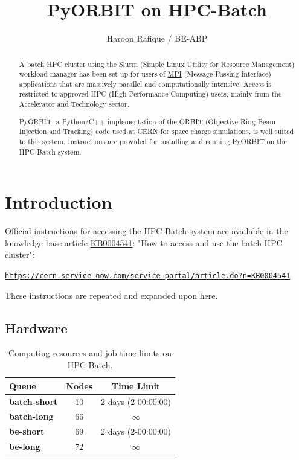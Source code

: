 \documentclass[a4paper]{cernatsnote}
\title{PyORBIT on HPC-Batch}
\author{Haroon Rafique / BE-ABP}
\def \howtoaccess {\url{https://cern.service-now.com/service-portal/article.do?n=KB0004541}}
\begin{document}
	
\maketitle %

\begin{abstract}
	A batch HPC cluster using the \href{https://slurm.schedmd.com/}{Slurm} (Simple Linux Utility for Resource Management) workload manager has been set up for users of \href{https://www.open-mpi.org/}{MPI} (Message Passing Interface) applications that are massively parallel and computationally intensive. Access is restricted to approved HPC (High Performance Computing) users, mainly from the Accelerator and Technology sector. 
	
	PyORBIT, a Python/C++ implementation of the ORBIT (Objective Ring Beam Injection and Tracking) code used at CERN for space charge simulations, is well suited to this system. Instructions are provided for installing and running PyORBIT on the HPC-Batch system.
\end{abstract}

\section{Introduction}
\label{sec:intro}
	
Official instructions for accessing the HPC-Batch system are available in the knowledge base article \href{https://cern.service-now.com/service-portal/article.do?n=KB0004541}{KB0004541}: "How to access and use the batch HPC cluster":

\texttt{\howtoaccess}

These instructions are repeated and expanded upon here. 
	
\subsection{Hardware}

\begin{table}
	\begin{center}
		\begin{tabular}[!b]{|l|c|c|}
			\hline
			\textbf{Queue} 			& \textbf{Nodes} & \textbf{Time Limit} \\
			\hline
			\textbf{batch-short}	& 10			  & 2 days (2-00:00:00) \\
			\textbf{batch-long}		& 66			  & $\infty$ \\
			\textbf{be-short}		& 69			  & 2 days (2-00:00:00) \\
			\textbf{be-long}		& 72			  & $\infty$ \\
			\hline
		\end{tabular}
		\caption{Computing resources and job time limits on HPC-Batch.}
		\label{tab:cpus}
	\end{center}
\end{table}
\end{document}
